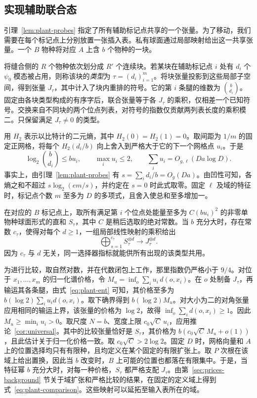 \subsection{实现辅助联合态}\label{subsec:plant-private}

引理~\ref{lem:plant-probes} 指定了所有辅助标记点共享的一个张量。为了移动，我们需要在每个标记点上分别放置一张插入表。私有球面通过局部映射给出这一共享张量。一个 $B$ 物种将对应 $A$ 上含 $b$ 个物种的一块。

将缝合侧的 $R$ 个物种依次划分成 $R'$ 个连续块。若某块在辅助标记点 $i$ 处有 $d_i$ 个 $\psi_0$ 模态被占用，则称该块的\emph{类型}为 $\tau=(d_i)_{i=1}^m$。将块张量投影到这些局部子空间，得到张量 $J_\tau$，其中计入了块内重排的符号。它的第 $i$ 条腿的维数为 $\binom b{d_i}$。固定由各块类型构成的有序字后，联合张量等于各 $J_\tau$ 的乘积，仅相差一个已知符号。交换来自不同块的两个位点列表，对符号的指数仅贡献两列表长度的乘积模二。只保留满足 $J_\tau\ne0$ 的类型。

用 $H_2$ 表示以比特计的二元熵，其中 $H_2(0)=H_2(1)=0$。取间距为 $1/m$ 的固定正网格，将每个 $H_2(d_i/b)$ 向上舍入到严格大于它的下一个网格点 $u_i$。于是
\begin{equation}\label{eq:plant-ent}
 \log_2\binom b{d_i}\le b u_i,\qquad
 \max_i u_i\le 2,\qquad \sum_i u_i=O_{g,\ell}(Da\log D).
\end{equation} 事实上，由引理~\ref{lem:plant-probes} 有 $s=\sum_i d_i/b=O_g(Da)$。由凹性可知，各熵之和不超过 $s\log_2(em/s)$，并约定在 $s=0$ 时此式取零。固定 $\ell$ 及域的特征时，标记点个数 $m$ 至多为 $D$ 的多项式，且舍入使总和至多增加一。

在对应的 $B$ 标记点上，取所有满足第 $i$ 个位点处能量至多为 $C(bu_i)^2$ 的非零单物种球面形式的直和 $S_\tau$，其中 $C$ 是稍后选取的绝对常数。当 $b$ 充分大时，存在常数 $c_\tau$，使得对每个 $d\ge1$，一组局部线性映射的乘积给出
\begin{equation}\label{eq:plant-comparison}
 \bigoplus_{s=1}^{c_\tau} S_\tau^{\otimes d}
                    \longrightarrow J_\tau^{\otimes d}.
\end{equation} 因为 $c_\tau$ 与 $d$ 无关，同一选择器指标就能供所有出现的该类型共用。

为进行比较，取自然对数，并在代数闭包上工作，那里指数仍严格小于 $9/4$。对位于 $x_1,\ldots,x_m$ 的归一化谱价格，令 $M_u=\inf_o\sum_i u_i\,d(o,x_i)$。在 $o$ 处制备 $J_\tau$，再输运其各条腿，由式~\eqref{eq:plant-ent} 可知，其价格至多为 $b(\log 2)\sum_i u_i d(o,x_i)$。取下确界得到 $b(\log 2)M_u$。对大小为二的对角张量应用相同的输运上界，该张量的价格为 $\log 2$，故得 $\inf_o\sum_i d(o,x_i)\ge1$。因此 $M_u\ge\min_i u_i>0$。取尺度 $N=b$、宽度上限 $c_0\sqrt C\,u_i$，应用推论~\ref{cor:universal}。其中的比较张量恰好是 $S_\tau$，其价格为 $b(c_0\sqrt C\,M_u+o(1))$，且此估计关于归一化价格一致。取 $c_0\sqrt C>2\log 2$。固定 $D$ 时，网格向量和 $A$ 上的位置选择均只有有限种，且均定义在某个固定的有限扩张上。取 $P$ 次根在该域上给出置换，因此当 $b$ 改变时，$B$ 上可能的位置也都落在有限集中。于是，当特征幂 $b$ 充分大时，对每一种价格，$S_\tau$ 都严格支配 $J_\tau$。由第~\ref{sec:prices-background} 节关于域扩张和严格比较的结果，在固定的定义域上得到式~\eqref{eq:plant-comparison}。这些映射可以延拓至输入表所在的域。

